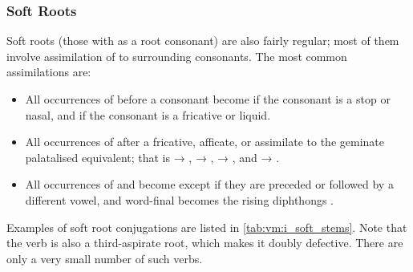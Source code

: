 \documentclass[grammar]{subfiles}
\begin{document}
\subsubsection{Soft Roots}
\label{sssec:vm:i_soft}

Soft roots (those with  as a root consonant) are also fairly regular; 
most of them involve assimilation of  to surrounding consonants. The most 
common assimilations are:

\begin{itemize}
  \item All occurrences of  before a consonant become  if the consonant is a
    stop or nasal, and  if the consonant is a fricative or liquid.  
  \item All occurrences of  after a fricative, afficate, or  assimilate to the
    geminate palatalised equivalent; that is  → ,  →
    ,  → , and  → .
  \item All occurrences of  and  become  except if they are
    preceded or followed by a different vowel, and word-final  becomes the
    rising diphthongs . 
\end{itemize}

Examples of soft root conjugations are listed in \cref{tab:vm:i_soft_stems}.
Note that the verb  is also a third-aspirate root, which makes it
doubly defective.  There are only a very small number of such verbs.  
\end{document}
